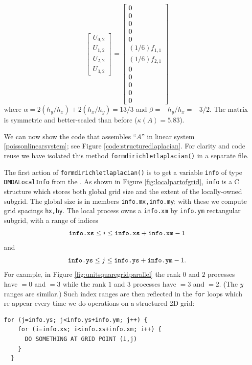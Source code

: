 \begin{example}
\begin{equation*}
\begin{bmatrix}
U_{0,2} \\
U_{1,2} \\
U_{2,2} \\
U_{3,2}
\end{bmatrix}
=
\begin{bmatrix}
0 \\
0 \\
0 \\
0 \\
0 \\
(1/6) f_{1,1} \\
(1/6) f_{2,1} \\
0 \\
0 \\
0 \\
0 \\
0
\end{bmatrix}
\end{equation*}
where $\alpha = 2 (h_y/h_x) + 2 (h_x/h_y) = 13/3$ and $\beta = - h_y/h_x = - 3/2$.  The matrix is symmetric and better-scaled than before ($\kappa(A)=5.83$).
\end{example}
\noindent\hrulefill

We can now show the code that assembles ``$A$'' in linear system \eqref{poissonlinearsystem}; see Figure \ref{code:structuredlaplacian}.  For clarity and code reuse we have isolated this method \texttt{formdirichletlaplacian()} in a separate file.


The first action of \texttt{formdirichletlaplacian()} is to get a variable \texttt{info} of type \texttt{DMDALocalInfo} from the \pDM.  As shown in Figure \ref{fig:localpartofgrid}, \texttt{info} is a C structure which stores both global grid size and the extent of the locally-owned subgrid.  The global size is in members \texttt{info.mx,info.my}; with these we compute grid spacings \texttt{hx,hy}.  The local process owns a \texttt{info.xm} by \texttt{info.ym} rectangular subgrid, with a range of indices
   $$\text{\texttt{info.xs}} \le i \le \text{\texttt{info.xs}} +\text{\texttt{info.xm}}-1$$
and
   $$\text{\texttt{info.ys}} \le j \le \text{\texttt{info.ys}} +\text{\texttt{info.ym}}-1.$$
For example, in Figure \ref{fig:unitsquaregridparallel} the rank $0$ and $2$ processes have $=0$ and $=3$ while the rank $1$ and $3$ processes have $=3$ and $=2$.  (The $y$ ranges are similar.)  Such index ranges are then reflected in the \texttt{for} loops which re-appear every time we do operations on a structured 2D grid:
\begin{Verbatim}[fontsize=\small]
  for (j=info.ys; j<info.ys+info.ym; j++) {
    for (i=info.xs; i<info.xs+info.xm; i++) {
      DO SOMETHING AT GRID POINT (i,j)
    }
  }
\end{Verbatim}

